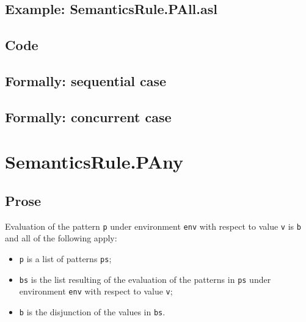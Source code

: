 \documentclass{book}
\begin{document}
  \subsection{Example: SemanticsRule.PAll.asl}

  \subsection{Code}

\begin{emptyformal}
  \subsection{Formally: sequential case}

  \subsection{Formally: concurrent case}
\end{emptyformal}


\section{SemanticsRule.PAny \label{sec:SemanticsRule.PAny}}

    \subsection{Prose}
  Evaluation of the pattern \texttt{p} under environment \texttt{env} with
  respect to value \texttt{v} is \texttt{b} and all of the following apply:
    \begin{itemize}
      \item \texttt{p} is a list of patterns \texttt{ps};
      \item \texttt{bs} is the list resulting of the evaluation of the patterns in \texttt{ps} under environment \texttt{env} with respect to value \texttt{v};
      \item \texttt{b} is the disjunction of the values in \texttt{bs}.
    \end{itemize}
\end{document}
